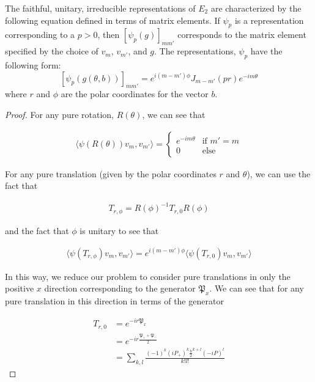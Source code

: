 \begin{theorem} \cite{Tung} 
	The faithful, unitary, irreducible representations of $E_2$ are characterized by the following equation defined in terms of matrix elements. If $\psi_p$ is a representation corresponding to a $p>0$, then $[\psi_p(g)]_{mm'}$ corresponds to the matrix element specified by the choice of $v_m$, $v_{m'}$, and $g$. The representations, $\psi_p$ have the following form:
$$[\psi_p(g(\theta,b))]_{mm'} = e^{i(m-m')\phi}J_{m-m'}(pr)e^{-im\theta}$$
where $r$ and $\phi$ are the polar coordinates for the vector $b$.
\end{theorem}
\noindent\begin{proof} For any pure rotation, $R(\theta)$, we can see that

\begin{equation}
\begin{aligned}
 \langle \psi(R(\theta))v_m , v_{m'} \rangle = \begin{cases}
																e^{-im\theta} & \text{if }m' = m\\
																0 & \text{else}
															\end{cases}
\end{aligned}
\end{equation}

For any pure translation (given by the polar coordinates $r$ and $\theta$), we can use the fact that

\begin{equation}
\begin{aligned}
	T_{r,\phi} = R(\phi)^{-1}T_{r,0}R(\phi)
\end{aligned}
\end{equation}

and the fact that $\phi$ is unitary to see that 

\begin{equation}
\begin{aligned}
 \langle \psi(T_{r,\phi})v_m , v_{m'} \rangle = e^{i(m-m')\phi}\langle \psi(T_{r,0})v_m , v_{m'} \rangle
\end{aligned}
\end{equation}

In this way, we reduce our problem to consider pure translations in only the positive $x$ direction corresponding to the generator $\mathfrak{P}_x$. We can see that for any pure translation in this direction in terms of the generator

\begin{equation}
\begin{aligned}
	 T_{r,0} &= e^{-ir\mathfrak{P}_x}\\
			&= e^{-ir\frac{\mathfrak{P}_++\mathfrak{P}_-}{2}} \\
			&= \sum_{k,l} \frac{(-1)^k(iP_+)^k\frac{b}{2}^{k+l}(-iP)^l}{k!l!}
\end{aligned}
\end{equation}


\end{proof}
